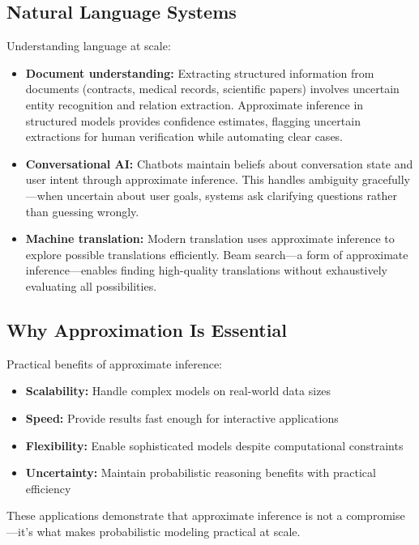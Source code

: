 \subsection{Natural Language Systems}

Understanding language at scale:

\begin{itemize}
    \item \textbf{Document understanding:} Extracting structured information from documents (contracts, medical records, scientific papers) involves uncertain entity recognition and relation extraction. Approximate inference in structured models provides confidence estimates, flagging uncertain extractions for human verification while automating clear cases.
    
    \item \textbf{Conversational AI:} Chatbots maintain beliefs about conversation state and user intent through approximate inference. This handles ambiguity gracefully—when uncertain about user goals, systems ask clarifying questions rather than guessing wrongly.
    
    \item \textbf{Machine translation:} Modern translation uses approximate inference to explore possible translations efficiently. Beam search—a form of approximate inference—enables finding high-quality translations without exhaustively evaluating all possibilities.
\end{itemize}

\subsection{Why Approximation Is Essential}

Practical benefits of approximate inference:
\begin{itemize}
    \item \textbf{Scalability:} Handle complex models on real-world data sizes
    \item \textbf{Speed:} Provide results fast enough for interactive applications
    \item \textbf{Flexibility:} Enable sophisticated models despite computational constraints
    \item \textbf{Uncertainty:} Maintain probabilistic reasoning benefits with practical efficiency
\end{itemize}

These applications demonstrate that approximate inference is not a compromise—it's what makes probabilistic modeling practical at scale.

